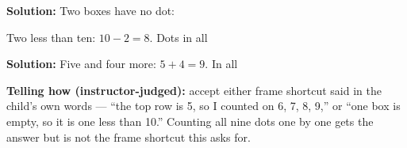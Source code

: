 \documentclass[12pt]{article}
\begin{document}

\textbf{Solution:} Two boxes have no dot: 

Two less than ten: $10 - 2 = 8$. Dots in all 


\textbf{Solution:} Five and four more: $5 + 4 = 9$. In all 

\textbf{Telling how (instructor-judged):} accept either frame shortcut said in
the child's own words --- ``the top row is 5, so I counted on 6, 7, 8, 9,'' or
``one box is empty, so it is one less than 10.'' Counting all nine dots one by
one gets the answer but is not the frame shortcut this asks for.
\end{document}
